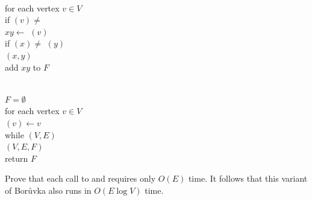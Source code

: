 \begin{exercises}
\begin{center}
\begin{minipage}[c]{0.47\linewidth}
\begin{pseudocode}
\\
for each vertex $v \in V$\\
\Indent if $(v) \neq$  \\
\Indent\Indent $x y\gets$  $(v)$\\
\Indent\Indent if $(x) \neq$  $(y)$\\
\Indent\Indent\Indent {}$(x, y)$\\
\Indent\Indent\Indent add $x y$ to $F$
\end{pseudocode}
\end{minipage}\hfill
\begin{minipage}[c]{0.47\linewidth}
\begin{pseudocode}
\\
$F= \emptyset$\\
for each vertex $v \in V$\\
\Indent {}$(v) \gets v$\\
while $(V, E)$\\
\Indent {}$(V, E, F)$\\
return $F$
\end{pseudocode}
\end{minipage}
\end{center}

Prove that each call to  and  requires only $O(E)$ time.  It follows that this variant of Borůvka also runs in $O(E \log  V)$ time.
\end{exercises}
